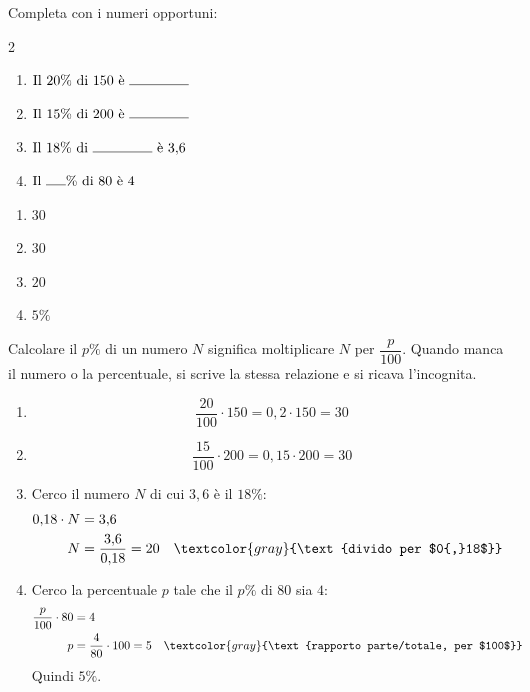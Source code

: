\begin{question}[ID=1.1, subtitle={Completamento con percentuali — serie 1}, tags={percentuali}, difficulty=facile]
Completa con i numeri opportuni:
\begin{center}\begin{minipage}{0.92\linewidth}
\begin{multicols}{2}
\begin{enumerate}
\item $\text{Il }20\%\text{ di }150\text{ è } \rule{1.5cm}{0.4pt}$
\item $\text{Il }15\%\text{ di }200\text{ è } \rule{1.5cm}{0.4pt}$
\item $\text{Il }18\%\text{ di } \rule{1.5cm}{0.4pt} \text{ è }3{,}6$
\item $\text{Il } \rule{0.5cm}{0.4pt}\%\text{ di }80\text{ è }4$
\end{enumerate}
\end{multicols}
\end{minipage}\end{center}
\begin{solution}
\begin{enumerate}
    \item $30$
    \item $30$
    \item $20$
    \item $5\%$
\end{enumerate}
\end{solution}
\begin{explanation}
Calcolare il $p\%$ di un numero $N$ significa moltiplicare $N$ per $\dfrac{p}{100}$. Quando manca il numero o la percentuale, si scrive la stessa relazione e si ricava l'incognita.
\begin{enumerate}
    \item \[ \dfrac{20}{100}\cdot150=0{,}2\cdot150=30 \]
    \item \[ \dfrac{15}{100}\cdot200=0{,}15\cdot200=30 \]
    \item Cerco il numero $N$ di cui $3{,}6$ è il $18\%$:
    \[\begin{aligned}
    0{,}18\cdot N &= 3{,}6\\
    N &= \dfrac{3{,}6}{0{,}18}=20 && \textcolor{gray}{\text{divido per $0{,}18$}}
    \end{aligned}\]
    \item Cerco la percentuale $p$ tale che il $p\%$ di $80$ sia $4$:
    \[\begin{aligned}
    \dfrac{p}{100}\cdot80 &= 4\\
    p &= \dfrac{4}{80}\cdot100=5 && \textcolor{gray}{\text{rapporto parte/totale, per $100$}}
    \end{aligned}\]
    Quindi $5\%$.
\end{enumerate}
\end{explanation}
\end{question}

